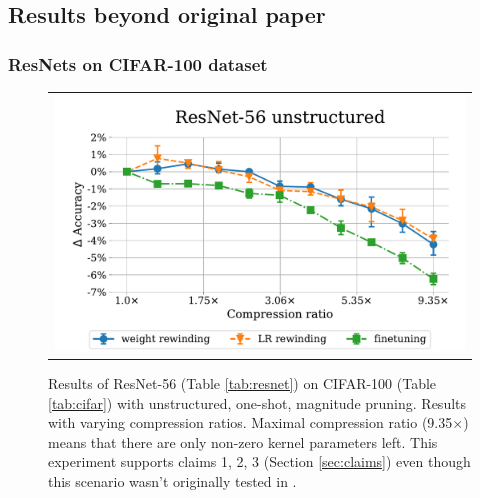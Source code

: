 



\subsection{Results beyond original paper}
 
\subsubsection{ResNets on CIFAR-100 dataset}
\nopagebreak
\begin{figure}[H]
\setlength{\tabcolsep}{0pt}
\centering
    \begin{tabular}{c}
      \includegraphics[width=0.7\linewidth]{pics/Resnet56-C100.pdf}
    \end{tabular}
\caption{Results of ResNet-56 (Table \ref{tab:resnet}) on CIFAR-100 (Table \ref{tab:cifar}) with unstructured, one-shot, magnitude pruning. Results with varying compression ratios. Maximal compression ratio (9.35$\times$) means that there are only  non-zero kernel parameters left. This experiment supports claims 1, 2, 3 (Section \ref{sec:claims}) even though this scenario wasn't originally tested in \cite{Renda}.}
\label{fig:resnet56-2}
\end{figure}

